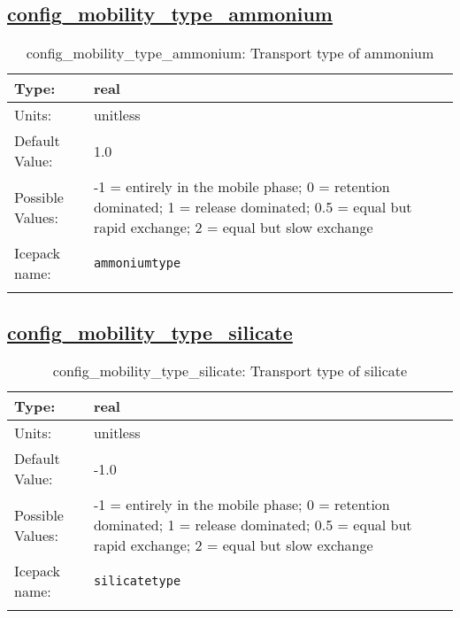 \subsection[config\_mobility\_type\_ammonium]{\hyperref[sec:nm_tab_biogeochemistry]{config\_mobility\_type\_ammonium}}
\label{subsec:nm_sec_config_mobility_type_ammonium}
\begin{center}
\begin{longtable}{| p{2.0in} || p{4.0in} |}
    \hline
    Type: & real \\
    \hline
    Units: & \si{unitless} \\
    \hline
    Default Value: & 1.0 \\
    \hline
    Possible Values: & -1 = entirely in the mobile phase; 0 = retention dominated; 1 = release dominated; 0.5 = equal but rapid exchange; 2 = equal but slow exchange \\
    \hline
    \hline
    Icepack name: & \verb+ammoniumtype+ \\
    \caption{config\_mobility\_type\_ammonium: Transport type of ammonium}
\end{longtable}
\end{center}
\subsection[config\_mobility\_type\_silicate]{\hyperref[sec:nm_tab_biogeochemistry]{config\_mobility\_type\_silicate}}
\label{subsec:nm_sec_config_mobility_type_silicate}
\begin{center}
\begin{longtable}{| p{2.0in} || p{4.0in} |}
    \hline
    Type: & real \\
    \hline
    Units: & \si{unitless} \\
    \hline
    Default Value: & -1.0 \\
    \hline
    Possible Values: & -1 = entirely in the mobile phase; 0 = retention dominated; 1 = release dominated; 0.5 = equal but rapid exchange; 2 = equal but slow exchange \\
    \hline
    \hline
    Icepack name: & \verb+silicatetype+ \\
    \caption{config\_mobility\_type\_silicate: Transport type of silicate}
\end{longtable}
\end{center}
